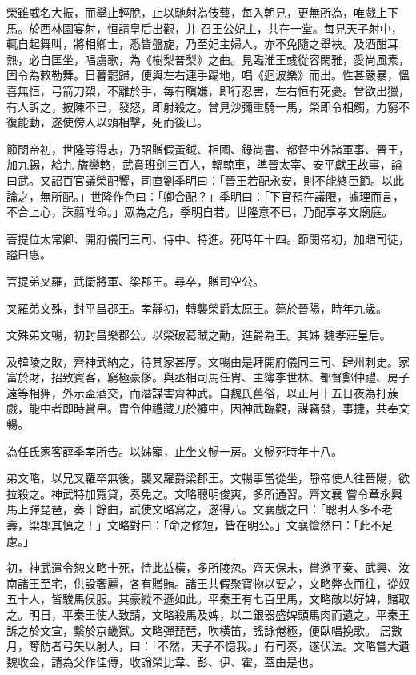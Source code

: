 \begin{pinyinscope}
 榮雖威名大振，而舉止輕脫，止以馳射為伎藝，每入朝見，更無所為，唯戲上下馬。於西林園宴射，恒請皇后出觀，并
 召王公妃主，共在一堂。每見天子射中，輒自起舞叫，將相卿士，悉皆盤旋，乃至妃主婦人，亦不免隨之舉袂。及酒酣耳熱，必自匡坐，唱虜歌，為《樹梨普梨》之曲。見臨淮王彧從容閑雅，愛尚風素，固令為敕勒舞。日暮罷歸，便與左右連手蹋地，唱《迴波樂》而出。性甚嚴暴，慍喜無恒，弓箭刀槊，不離於手，每有瞋嫌，即行忍害，左右恒有死憂。曾欲出獵，有人訴之，披陳不已，發怒，即射殺之。曾見沙彌重騎一馬，榮即令相觸，力窮不復能動，遂使傍人以頭相擊，死而後已。



 節閔帝初，世隆等得志，乃詔贈假黃鉞、相國、錄尚書、都督中外諸軍事、晉王，加九錫，給九
 旒鑾輅，武賁班劍三百人，轀輬車，準晉太宰、安平獻王故事，謚曰武。又詔百官議榮配饗，司直劉季明曰：「晉王若配永安，則不能終臣節。以此論之，無所配。」世隆作色曰：「卿合配？」季明曰：「下官預在議限，據理而言，不合上心，誅翦唯命。」眾為之危，季明自若。世隆意不已，乃配享孝文廟庭。



 菩提位太常卿、開府儀同三司、侍中、特進。死時年十四。節閔帝初，加贈司徒，謚曰惠。



 菩提弟叉羅，武衛將軍、梁郡王。尋卒，贈司空公。



 叉羅弟文殊，封平昌郡王。孝靜初，轉襲榮爵太原王。薨於晉陽，時年九歲。



 文殊弟文暢，初封昌樂郡公。以榮破葛賊之勳，進爵為王。其姊
 魏孝莊皇后。



 及韓陵之敗，齊神武納之，待其家甚厚。文暢由是拜開府儀同三司、肆州刺史。家富於財，招致賓客，窮極豪侈。與丞相司馬任胄、主簿李世林、都督鄭仲禮、房子遠等相狎，外示盃酒交，而潛謀害齊神武。自魏氏舊俗，以正月十五日夜為打蔟戲，能中者即時賞帛。胄令仲禮藏刀於褲中，因神武臨觀，謀竊發，事捷，共奉文暢。



 為任氏家客薛季孝所告。以姊寵，止坐文暢一房。文暢死時年十八。



 弟文略，以兄叉羅卒無後，襲叉羅爵梁郡王。文暢事當從坐，靜帝使人往晉陽，欲拉殺之。神武特加寬貸，奏免之。文略聰明俊爽，多所通習。齊文襄
 嘗令章永興馬上彈琵琶，奏十餘曲，試使文略寫之，遂得八。文襄戲之曰：「聰明人多不老壽，梁郡其慎之！」文略對曰：「命之修短，皆在明公。」文襄愴然曰：「此不足慮。」



 初，神武遣令恕文略十死，恃此益橫，多所陵忽。齊天保末，嘗邀平秦、武興、汝南諸王至宅，供設奢麗，各有贈賄。諸王共假聚寶物以要之，文略弊衣而往，從奴五十人，皆駿馬侯服。其豪縱不遜如此。平秦王有七百里馬，文略敵以好婢，賭取之。明日，平秦王使人致請，文略殺馬及婢，以二銀器盛婢頭馬肉而遺之。平秦王訴之於文宣，繫於京畿獄。文略彈琵琶，吹橫笛，謠詠倦極，便臥唱挽歌。
 居數月，奪防者弓矢以射人，曰：「不然，天子不憶我。」有司奏，遂伏法。文略嘗大遺魏收金，請為父作佳傳，收論榮比韋、彭、伊、霍，蓋由是也。




\end{pinyinscope}

